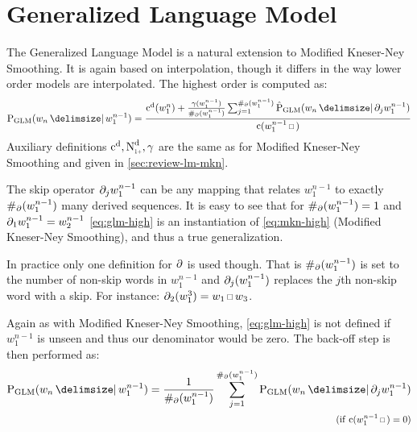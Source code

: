 \section{Generalized Language Model}
\label{sec:review-lm-glm}

The Generalized Language Model is a natural extension to Modified Kneser-Ney
Smoothing.
It is again based on interpolation, though it differs in the way lower order
models are interpolated.
The highest order is computed as:
\begin{equation}
  \label{eq:glm-high}
  \ProbGLM{w_n}{w_1^{n-1}} =
    \frac{\DiscountedCount(w_1^n) + \frac{\gamma(w_1^{n-1})}{\NumSkpOp(w_1^{n-1})}
                                    \sum_{j=1}^{\NumSkpOp(w_1^{n-1})} \ProbGLM*{w_n}{\SkpOp_j w_1^{n-1}}}
         {\Count(w_1^{n-1} \Skp)}
\end{equation}
Auxiliary definitions $\DiscountedCount, \DiscountedCount*, \gamma$ are the same
as for Modified Kneser-Ney Smoothing and given in \cref{sec:review-lm-mkn}.

The skip operator $\partial_j w_1^{n-1}$ can be any mapping that relates
$w_1^{n-1}$ to exactly $\#_\partial(w_1^{n-1})$ many derived sequences.
It is easy to see that for $\#_\partial(w_1^{n-1}) = 1$ and
$\partial_1 w_1^{n-1} = w_2^{n-1}$ \cref{eq:glm-high} is an
instantiation of \cref{eq:mkn-high} (Modified Kneser-Ney Smoothing), and thus
a true generalization.

In practice only one definition for $\partial$ is used though.
That is $\#_\partial(w_1^{n-1})$ is set to the number of non-skip words in
$w_1^{n-1}$ and $\partial_j(w_1^{n-1})$ replaces the $j$th non-skip word with
a skip.
For instance: $\SkpOp_2(w_1^3) = w_1 \Skp w_3$.

Again as with Modified Kneser-Ney Smoothing, \cref{eq:glm-high} is not
defined if $w_1^{n-1}$ is unseen and thus our denominator would be zero.
The back-off step is then performed as:
\begin{equation}
  \label{eq:glm-backoff}
  \begin{split}
    \ProbGLM{w_n}{w_1^{n-1}} = \frac{1}{\NumSkpOp(w_1^{n-1})}
                               \sum_{j=1}^{\NumSkpOp(w_1^{n-1})} \ProbGLM{w_n}{\SkpOp_j w_1^{n-1}} \\
      \hfill \Condition{\Count(w_1^{n-1} \Skp) = 0}
  \end{split}
\end{equation}

